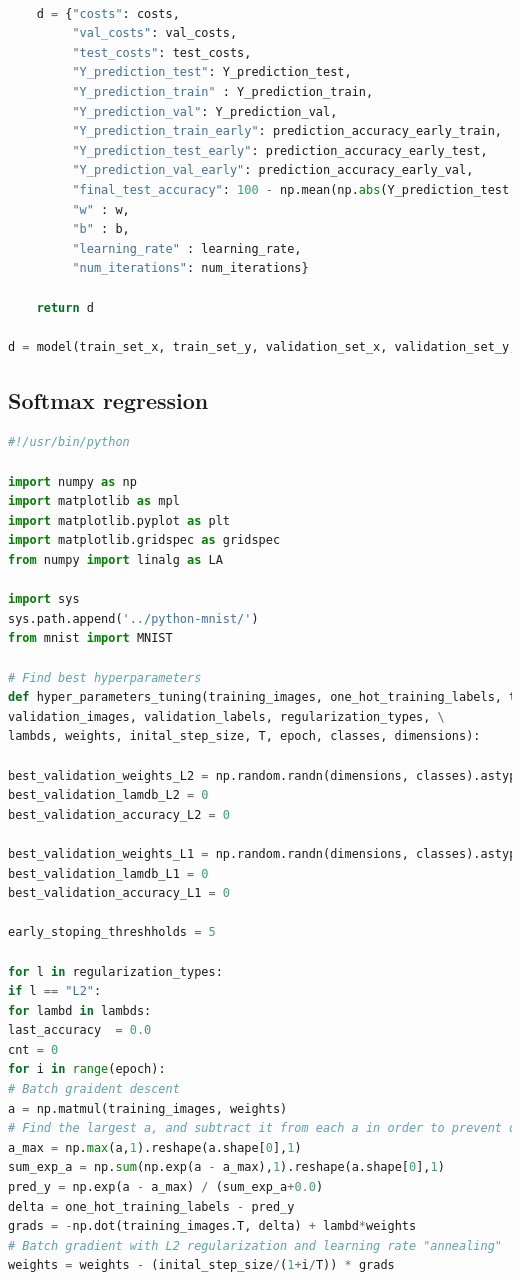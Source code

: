 \documentclass{article} %
\begin{document}
{\begin{lstlisting}[language=Python]
    
    d = {"costs": costs,
         "val_costs": val_costs,
         "test_costs": test_costs,
         "Y_prediction_test": Y_prediction_test, 
         "Y_prediction_train" : Y_prediction_train, 
         "Y_prediction_val": Y_prediction_val,
         "Y_prediction_train_early": prediction_accuracy_early_train,
         "Y_prediction_test_early": prediction_accuracy_early_test,
         "Y_prediction_val_early": prediction_accuracy_early_val,
         "final_test_accuracy": 100 - np.mean(np.abs(Y_prediction_test - Y_test)) * 100,
         "w" : w, 
         "b" : b,
         "learning_rate" : learning_rate,
         "num_iterations": num_iterations}
    
    return d

d = model(train_set_x, train_set_y, validation_set_x, validation_set_y, test_set_x, test_set_y, lambda_reg = 0, reg_type = 2, num_iterations = 5000, learning_rate = 0.01, print_cost = True, early_stopping = False)
\end{lstlisting}

\subsection{Softmax regression}
\begin{lstlisting}[language=Python]
#!/usr/bin/python 

import numpy as np
import matplotlib as mpl
import matplotlib.pyplot as plt
import matplotlib.gridspec as gridspec
from numpy import linalg as LA

import sys
sys.path.append('../python-mnist/')
from mnist import MNIST

# Find best hyperparameters 
def hyper_parameters_tuning(training_images, one_hot_training_labels, test_images, test_labels, \
validation_images, validation_labels, regularization_types, \
lambds, weights, inital_step_size, T, epoch, classes, dimensions):

best_validation_weights_L2 = np.random.randn(dimensions, classes).astype(np.float32) 
best_validation_lamdb_L2 = 0
best_validation_accuracy_L2 = 0

best_validation_weights_L1 = np.random.randn(dimensions, classes).astype(np.float32) 
best_validation_lamdb_L1 = 0
best_validation_accuracy_L1 = 0

early_stoping_threshholds = 5

for l in regularization_types:
if l == "L2":
for lambd in lambds:
last_accuracy  = 0.0
cnt = 0
for i in range(epoch):
# Batch graident descent
a = np.matmul(training_images, weights) 
# Find the largest a, and subtract it from each a in order to prevent overflow
a_max = np.max(a,1).reshape(a.shape[0],1)
sum_exp_a = np.sum(np.exp(a - a_max),1).reshape(a.shape[0],1) 
pred_y = np.exp(a - a_max) / (sum_exp_a+0.0) 
delta = one_hot_training_labels - pred_y 
grads = -np.dot(training_images.T, delta) + lambd*weights
# Batch gradient with L2 regularization and learning rate "annealing"
weights = weights - (inital_step_size/(1+i/T)) * grads


\end{lstlisting}}
\end{document}
